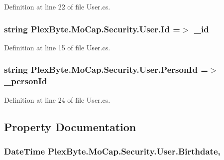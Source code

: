 Definition at line 22 of file User.\+cs.

\subsubsection[{\texorpdfstring{Id}{Id}}]{\setlength{\rightskip}{0pt plus 5cm}string Plex\+Byte.\+Mo\+Cap.\+Security.\+User.\+Id =$>$ \+\_\+id}\hypertarget{class_plex_byte_1_1_mo_cap_1_1_security_1_1_user_a3e485cc6481d7d6c144e1f7c4818e611}{}\label{class_plex_byte_1_1_mo_cap_1_1_security_1_1_user_a3e485cc6481d7d6c144e1f7c4818e611}


Definition at line 15 of file User.\+cs.

\subsubsection[{\texorpdfstring{Person\+Id}{PersonId}}]{\setlength{\rightskip}{0pt plus 5cm}string Plex\+Byte.\+Mo\+Cap.\+Security.\+User.\+Person\+Id =$>$ \+\_\+person\+Id}\hypertarget{class_plex_byte_1_1_mo_cap_1_1_security_1_1_user_a88a5440cb0d728dedb9f7fc59033f39e}{}\label{class_plex_byte_1_1_mo_cap_1_1_security_1_1_user_a88a5440cb0d728dedb9f7fc59033f39e}


Definition at line 24 of file User.\+cs.



\subsection{Property Documentation}
\subsubsection[{\texorpdfstring{Birthdate}{Birthdate}}]{\setlength{\rightskip}{0pt plus 5cm}Date\+Time Plex\+Byte.\+Mo\+Cap.\+Security.\+User.\+Birthdate\hspace{0.3cm}{\ttfamily [get]}, {\ttfamily [set]}}\hypertarget{class_plex_byte_1_1_mo_cap_1_1_security_1_1_user_a91c0564f89d8eb7eb0e19cf9bbf6f195}{}\label{class_plex_byte_1_1_mo_cap_1_1_security_1_1_user_a91c0564f89d8eb7eb0e19cf9bbf6f195}


